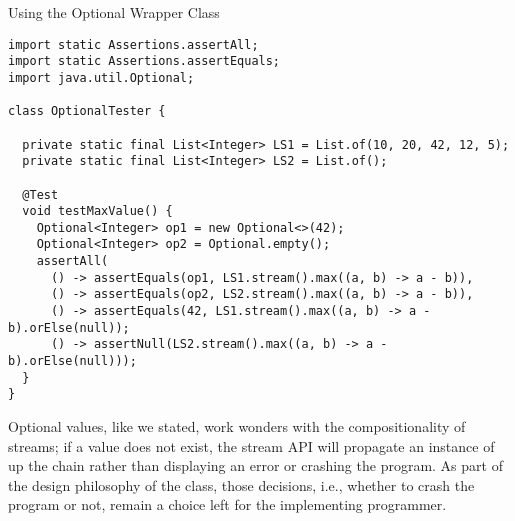 \begin{cl}[]{Using the Optional Wrapper Class}
\begin{lstlisting}[language=MyJava]
import static Assertions.assertAll;
import static Assertions.assertEquals;
import java.util.Optional;

class OptionalTester {

  private static final List<Integer> LS1 = List.of(10, 20, 42, 12, 5);
  private static final List<Integer> LS2 = List.of();

  @Test
  void testMaxValue() {
    Optional<Integer> op1 = new Optional<>(42);
    Optional<Integer> op2 = Optional.empty();
    assertAll(
      () -> assertEquals(op1, LS1.stream().max((a, b) -> a - b)),
      () -> assertEquals(op2, LS2.stream().max((a, b) -> a - b)),
      () -> assertEquals(42, LS1.stream().max((a, b) -> a - b).orElse(null));
      () -> assertNull(LS2.stream().max((a, b) -> a - b).orElse(null)));
  }
}
\end{lstlisting}
\end{cl}

Optional values, like we stated, work wonders with the compositionality of streams; if a value does not exist, the stream API will propagate an  instance of  up the chain rather than displaying an error or crashing the program. As part of the design philosophy of the class, those decisions, i.e., whether to crash the program or not, remain a choice left for the implementing programmer.